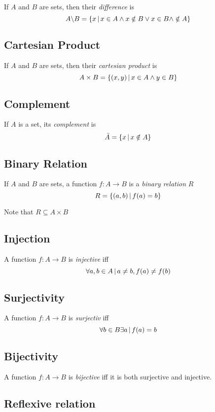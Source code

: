 \documentclass{article}
\begin{document}
If \(A\) and \(B\) are sets, then their \textit{difference} is
\[
    A \backslash B = \{x \,|\, x \in A \land x \notin B \lor x \in B \land \notin A\}
\]

\subsection{Cartesian Product}

If \(A\) and \(B\) are sets, then their \textit{cartesian product} is
\[
    A\times B = \{(x,y) \,|\, x \in A \land y \in B\}
\]

\subsection{Complement}

If \(A\) is a set, its \textit{complement} is
\[
    \bar{A} = \{x \,|\, x \notin A\}
\]

\subsection{Binary Relation}

If \(A\) and \(B\) are sets, a function \(f:A\to B\)
is a \textit{binary relation} \(R\)
\[
    R = \{(a,b) \,|\, f(a)=b\}
\]

Note that \(R\subseteq A\times B\)

\subsection{Injection}

A function \(f:A\to B\) is \textit{injective} iff
\[
    \forall a,b \in A \,|\, a\neq b, f(a)\neq f(b)
\]

\subsection{Surjectivity}

A function \(f:A\to B\) is \textit{surjectiv} iff
\[
    \forall b \in B \exists a \,|\, f(a)=b
\]

\subsection{Bijectivity}

A function \(f:A\to B\) is \textit{bijective} iff
it is both surjective and injective.

\subsection{Reflexive relation}
\end{document}

